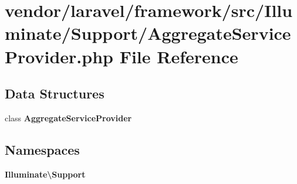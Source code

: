 \section{vendor/laravel/framework/src/\+Illuminate/\+Support/\+Aggregate\+Service\+Provider.php File Reference}
\label{_aggregate_service_provider_8php}
\subsection*{Data Structures}
\begin{DoxyCompactItemize}
\item 
class {\bf Aggregate\+Service\+Provider}
\end{DoxyCompactItemize}
\subsection*{Namespaces}
\begin{DoxyCompactItemize}
\item 
 {\bf Illuminate\textbackslash{}\+Support}
\end{DoxyCompactItemize}
